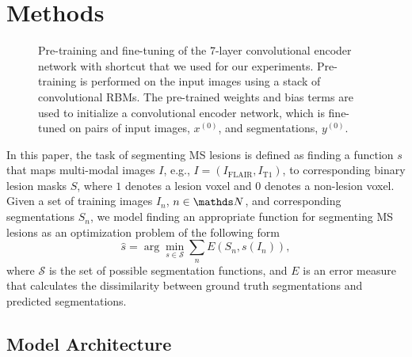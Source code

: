 \section{Methods}
\label{sec:method}

\begin{figure*}[tb]
\centering


\caption{Pre-training and fine-tuning of the 7-layer convolutional encoder
network with shortcut that we used for our experiments. Pre-training is
performed on the input images using a stack of convolutional RBMs. The
pre-trained weights and bias terms are used to initialize a convolutional
encoder network, which is fine-tuned on pairs of input images, $x^{(0)}$, and
segmentations, $y^{(0)}$.}

\label{fig:network}
\end{figure*}

In this paper, the task of segmenting MS lesions is defined as finding a
function $s$ that maps multi-modal images $I$, e.g., $I = (I_\text{FLAIR},
I_\text{T1})$, to corresponding binary lesion masks $S$, where $1$ denotes a
lesion voxel and $0$ denotes a non-lesion voxel. Given a set of training images
$I_n$, $n \in \N$, and corresponding segmentations $S_n$, we model finding an
appropriate function for segmenting MS lesions as an optimization problem of the
following form
\begin{equation}
\hat{s} = \arg \min_{s \in \mathcal{S}} \sum_n E(S_n, s(I_n)),
\label{eq:segprob}
\end{equation}
where $\mathcal{S}$ is the set of possible segmentation functions, and $E$ is an
error measure that calculates the dissimilarity between ground truth
segmentations and predicted segmentations.

\subsection{Model Architecture}

